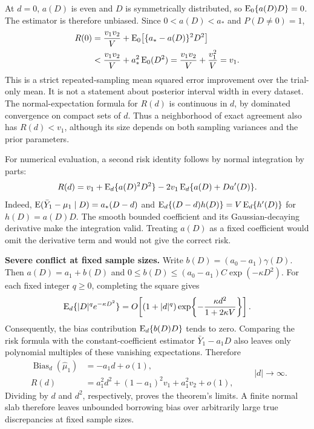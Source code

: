 At $d=0$, $a(D)$ is even and $D$ is symmetrically distributed, so $\operatorname{E}_0\{a(D)D\}=0$. The estimator is therefore unbiased. Since $0<a(D)<a_*$ and $P(D\ne0)=1$,
\begin{equation}\label{eq:agreement_risk_gain}
\begin{aligned}
R(0)&=\frac{v_1v_2}{V}+\operatorname{E}_0\!\left[\{a_*-a(D)\}^2D^2\right]\\
&<\frac{v_1v_2}{V}+a_*^2\operatorname{E}_0(D^2)
=\frac{v_1v_2}{V}+\frac{v_1^2}{V}=v_1.
\end{aligned}
\end{equation}
This is a strict repeated-sampling mean squared error improvement over the trial-only mean. It is not a statement about posterior interval width in every dataset. The normal-expectation formula for $R(d)$ is continuous in $d$, by dominated convergence on compact sets of $d$. Thus a neighborhood of exact agreement also has $R(d)<v_1$, although its size depends on both sampling variances and the prior parameters.

For numerical evaluation, a second risk identity follows by normal integration by parts:
\begin{equation}\label{eq:regional_stein_risk}
R(d)=v_1+\operatorname{E}_d\{a(D)^2D^2\}
-2v_1\operatorname{E}_d\{a(D)+Da'(D)\}.
\end{equation}
Indeed, $\operatorname{E}(\bar Y_1-\mu_1\mid D)=a_*(D-d)$ and
$\operatorname{E}_d\{(D-d)h(D)\}=V\operatorname{E}_d\{h'(D)\}$ for $h(D)=a(D)D$.
The smooth bounded coefficient and its Gaussian-decaying derivative make the integration valid. Treating $a(D)$ as a fixed coefficient would omit the derivative term and would not give the correct risk.

\noindent\textbf{Severe conflict at fixed sample sizes.}
Write $b(D)=(a_0-a_1)\gamma(D)$. Then $a(D)=a_1+b(D)$ and $0\leq b(D)\leq(a_0-a_1)C\exp(-\kappa D^2)$. For each fixed integer $q\geq0$, completing the square gives
\[
\operatorname{E}_d\{|D|^q e^{-\kappa D^2}\}
=O\!\left[(1+|d|^q)
\exp\!\left\{-\frac{\kappa d^2}{1+2\kappa V}\right\}\right].
\]
Consequently, the bias contribution $\operatorname{E}_d\{b(D)D\}$ tends to zero. Comparing the risk formula with the constant-coefficient estimator $\bar Y_1-a_1D$ also leaves only polynomial multiples of these vanishing expectations. Therefore
\begin{equation}\label{eq:regional_conflict_limits}
\begin{aligned}
\operatorname{Bias}_d(\widehat\mu_1)&=-a_1d+o(1),\\
R(d)&=a_1^2d^2+(1-a_1)^2v_1+a_1^2v_2+o(1),
\end{aligned}
\qquad |d|\to\infty.
\end{equation}
Dividing by $d$ and $d^2$, respectively, proves the theorem's limits. A finite normal slab therefore leaves unbounded borrowing bias over arbitrarily large true discrepancies at fixed sample sizes.

